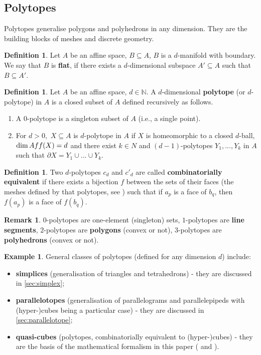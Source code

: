\documentclass{elsarticle}
\theoremstyle{definition}
\newtheorem{definition}[theorem]{Definition}
\newtheorem{example}[theorem]{Example}
\newtheorem{remark}[theorem]{Remark}
\newcommand{\N}{\mathbb{N}} %
\newcommand{\Aff}{\mathop{\rm Aff}\nolimits} %
\begin{document}
\subsection{Polytopes}
\label{sec:polytopes}
Polytopes generalise polygons and polyhedrons in any dimension. They are the building blocks of meshes and discrete geometry.
\begin{definition}
  Let $A$ be an affine space, $B \subseteq A$, $B$ is a $d$-manifold with boundary. We say that $B$ is \textbf{flat}, if there exists a $d$-dimensional subspace $A' \subseteq A$ such that $B \subseteq A'$.
\end{definition}
\begin{definition}
\label{thm:polytope}
  Let $A$ be an affine space, $d \in \N$. A $d$-dimensional \textbf{polytope} (or $d$-polytope) in $A$ is a closed subset of $A$ defined recursively as follows.
  \begin{enumerate}
    \item
      A $0$-polytope is a singleton subset of $A$ (i.e., a single point).
    \item
      For $d > 0,$ $X \subseteq A$ is $d$-polytope in $A$ if $X$ is homeomorphic to a closed $d$-ball, $\dim {\Aff}(X) = d$ and there exist $k \in N$ and $(d - 1)$-polytopes $Y_{1}, ..., Y_{k}$ in $A$ such that $\partial X = Y_{1} \cup ... \cup Y_{k}.$
  \end{enumerate}
\end{definition}
\begin{definition}
  Two $d$-polytopes $c_d$ and $c'_d$ are called \textbf{combinatorially equivalent} if there exists a bijection $f$ between the sets of their faces (the meshes defined by that polytopes, see ) such that if $a_p$ is a face of $b_q$, then $f(a_p)$ is a face of $f(b_q)$.
\end{definition}
\begin{remark}
  $0$-polytopes are one-element (singleton) sets,
  $1$-polytopes are \textbf{line segments},
  $2$-polytopes are \textbf{polygons} (convex or not),
  $3$-polytopes are \textbf{polyhedrons} (convex or not).
\end{remark}
\begin{example}
  General classes of polytopes (defined for any dimension $d$) include:
  \begin{itemize}
    \item
      \textbf{simplices} (generalisation of triangles and tetrahedrons) - they are discussed in \ref{sec:simplex};
    \item
      \textbf{parallelotopes} (generalisation of parallelograms and parallelepipeds with (hyper-)cubes being a particular case) - they are discussed in \ref{sec:parallelotope};
    \item
      \textbf{quasi-cubes} (polytopes, combinatorially equivalent to (hyper-)cubes) - they are the basis of the mathematical formalism in this paper ( and ).
  \end{itemize}
\end{example}
\end{document}
